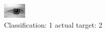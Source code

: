 \begin{figure}[h!]
\begin{center}
\includegraphics[width=0.60\columnwidth]{figures/ID453_class_1_target_2.png}
\end{center}
\caption{ Classification: 1 actual target: 2}
\label{fig:ID453_class_1_target_2}
\end{figure}
